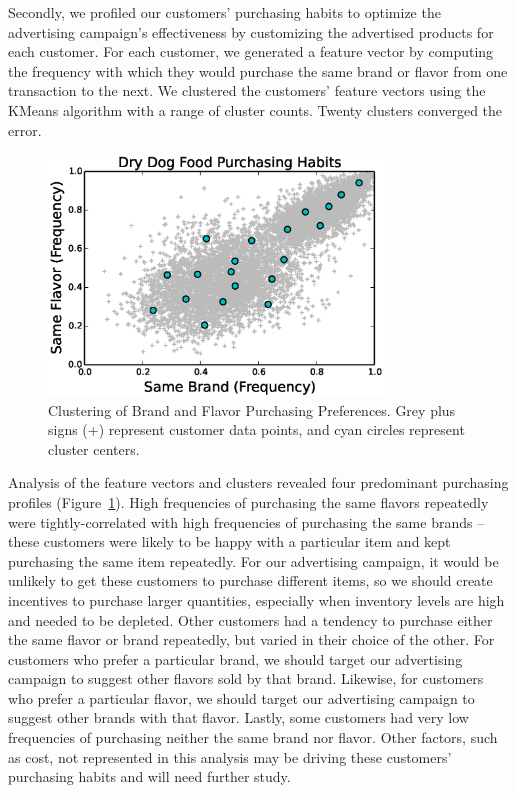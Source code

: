 \documentclass[conference]{IEEEtran}
\begin{document}
Secondly, we profiled our customers' purchasing habits to optimize the advertising campaign's effectiveness by customizing the advertised products for each customer.  For each customer, we generated a feature vector by computing the frequency with which they would purchase the same brand or flavor from one transaction to the next.  We clustered the customers' feature vectors using the KMeans algorithm with a range of cluster counts. Twenty clusters converged the error.

\begin{figure}[!t]
  \centering
  \includegraphics[width=3.5in]{figures/cluster_analysis.eps}
  \caption{Clustering of Brand and Flavor Purchasing Preferences. Grey plus signs (+) represent customer data points, and cyan circles represent cluster centers.}
  \label{fig:cluster_analysis}
\end{figure}

Analysis of the feature vectors and clusters revealed four predominant purchasing profiles (Figure~\ref{fig:cluster_analysis}).  High frequencies of purchasing the same flavors repeatedly were tightly-correlated with high frequencies of purchasing the same brands -- these customers were likely to be happy with a particular item and kept purchasing the same item repeatedly.  For our advertising campaign, it would be unlikely to get these customers to purchase different items, so we should create incentives to purchase larger quantities, especially when inventory levels are high and needed to be depleted.  Other customers had a tendency to purchase either the same flavor or brand repeatedly, but varied in their choice of the other.  For customers who prefer a particular brand, we should target our advertising campaign to suggest other flavors sold by that brand.  Likewise, for customers who prefer a particular flavor, we should target our advertising campaign to suggest other brands with that flavor.  Lastly, some customers had very low frequencies of purchasing neither the same brand nor flavor.  Other factors, such as cost, not represented in this analysis may be driving these customers' purchasing habits and will need further study.
\end{document}
